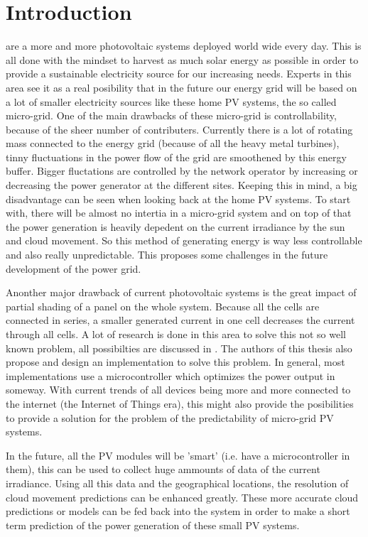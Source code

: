\documentclass[a4paper,journal]{DDREAM}
\begin{document}
\section{Introduction}\label{sec:introduction}
 are a more and more photovoltaic systems deployed world wide every day.
This is all done with the mindset to harvest as much solar energy as possible in order to provide a sustainable electricity source for our increasing needs.
Experts in this area see it as a real posibility that in the future our energy grid will be based on a lot of smaller electricity sources like these home PV systems, the so called micro-grid.
One of the main drawbacks of these micro-grid is controllability, because of the sheer number of contributers.
Currently there is a lot of rotating mass connected to the energy grid (because of all the heavy metal turbines), tinny fluctuations in the power flow of the grid are smoothened by this energy buffer.
Bigger fluctations are controlled by the network operator by increasing or decreasing the power generator at the different sites.
Keeping this in mind, a big disadvantage can be seen when looking back at the home PV systems.
To start with, there will be almost no intertia in a micro-grid system and on top of that the power generation is heavily depedent on the current irradiance by the sun and cloud movement.
So this method of generating energy is way less controllable and also really unpredictable.
This proposes some challenges in the future development of the power grid.

Anonther major drawback of current photovoltaic systems is the great impact of partial shading of a panel on the whole system.
Because all the cells are connected in series, a smaller generated current in one cell decreases the current through all cells.
A lot of research is done in this area to solve this not so well known problem, all possibilties are discussed in \cite{SoCeBa}.
The authors of this thesis also propose and design an implementation to solve this problem.
In general, most implementations use a microcontroller which optimizes the power output in someway.
With current trends of all devices being more and more connected to the internet (the Internet of Things era), this might also provide the posibilities to provide a solution for the problem of the predictability of micro-grid PV systems.

In the future, all the PV modules will be 'smart' (i.e. have a microcontroller in them), this can be used to collect huge ammounts of data of the current irradiance.
Using all this data and the geographical locations, the resolution of cloud movement predictions can be enhanced greatly.
These more accurate cloud predictions or models can be fed back into the system in order to make a short term prediction of the power generation of these small PV systems.
\end{document}
